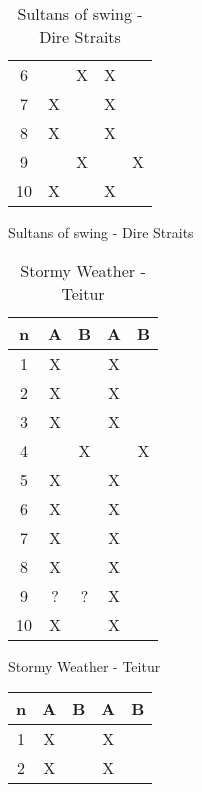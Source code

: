 \begin{figure}[H]
\begin{subfigure}[t]{0.20\textwidth}
\begin{table}[H]
\begin{tabular}{ccccc}
6         &          & X        & X       &         \\
7         & X        &          & X       &         \\
8         & X        &          & X       &         \\
9         &          & X        &         & X       \\
10        & X        &          & X       &         \\ \bottomrule 
\end{tabular}
\caption{Sultans of swing - Dire Straits}
\label{tab:Sultansofswing}
\end{table}
\end{subfigure}
\hfill
\begin{subfigure}[t]{0.20\textwidth}
\begin{table}[H]
\centering
\begin{tabular}{ccccc}
n       & A      & B      & A      & B      \\ \bottomrule
1       & X      &        & X      &        \\
2       & X      &        & X      &        \\
3       & X      &        & X      &        \\
4       &        & X      &        & X      \\ 
5       & X      &        & X      &        \\ \hline
6       & X      &        & X      &        \\
7       & X      &        & X      &        \\
8       & X      &        & X      &        \\
9       & ?      & ?      & X      &        \\
10      & X      &        & X      &        \\ \bottomrule
\end{tabular}
\caption{Stormy Weather - Teitur}
\label{tab:stormyweather}
\end{table}
\end{subfigure}
\hfill
\begin{subfigure}[t]{0.20\textwidth}
\begin{table}[H]
\centering
\begin{tabular}{ccccc}
n          & A         & B         & A         & B        \\ \bottomrule
1          & X         &           & X         &          \\
2          & X         &           & X         &          \\

\end{tabular}
\end{table}
\end{subfigure}
\end{figure}
